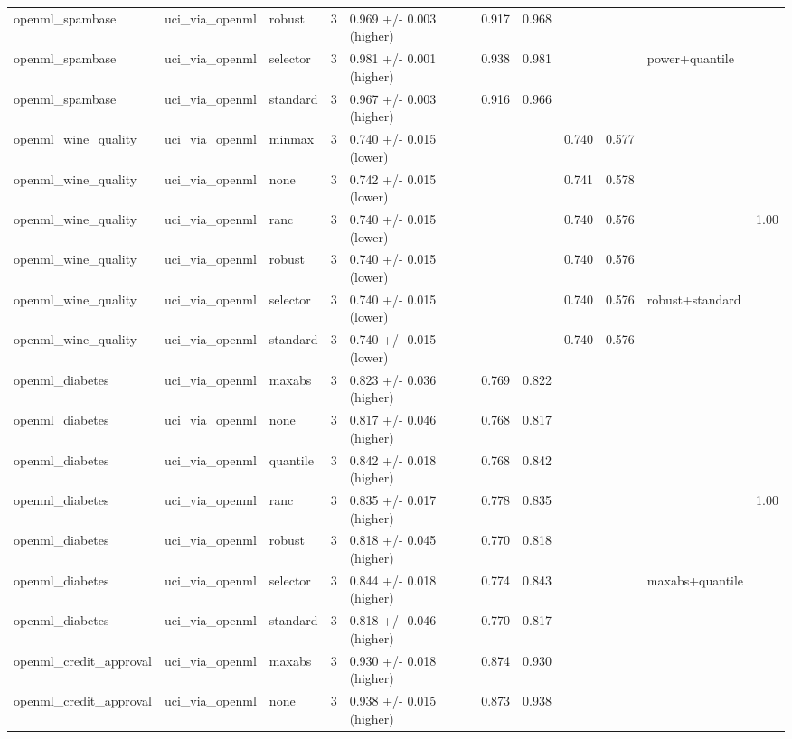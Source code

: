 \begin{tabular}{lllllllllll}
openml\_spambase & uci\_via\_openml & robust & 3 & 0.969 +/- 0.003 (higher) & 0.917 & 0.968 &  &  &  &  \\
openml\_spambase & uci\_via\_openml & selector & 3 & 0.981 +/- 0.001 (higher) & 0.938 & 0.981 &  &  & power+quantile &  \\
openml\_spambase & uci\_via\_openml & standard & 3 & 0.967 +/- 0.003 (higher) & 0.916 & 0.966 &  &  &  &  \\
openml\_wine\_quality & uci\_via\_openml & minmax & 3 & 0.740 +/- 0.015 (lower) &  &  & 0.740 & 0.577 &  &  \\
openml\_wine\_quality & uci\_via\_openml & none & 3 & 0.742 +/- 0.015 (lower) &  &  & 0.741 & 0.578 &  &  \\
openml\_wine\_quality & uci\_via\_openml & ranc & 3 & 0.740 +/- 0.015 (lower) &  &  & 0.740 & 0.576 &  & 1.00 \\
openml\_wine\_quality & uci\_via\_openml & robust & 3 & 0.740 +/- 0.015 (lower) &  &  & 0.740 & 0.576 &  &  \\
openml\_wine\_quality & uci\_via\_openml & selector & 3 & 0.740 +/- 0.015 (lower) &  &  & 0.740 & 0.576 & robust+standard &  \\
openml\_wine\_quality & uci\_via\_openml & standard & 3 & 0.740 +/- 0.015 (lower) &  &  & 0.740 & 0.576 &  &  \\
openml\_diabetes & uci\_via\_openml & maxabs & 3 & 0.823 +/- 0.036 (higher) & 0.769 & 0.822 &  &  &  &  \\
openml\_diabetes & uci\_via\_openml & none & 3 & 0.817 +/- 0.046 (higher) & 0.768 & 0.817 &  &  &  &  \\
openml\_diabetes & uci\_via\_openml & quantile & 3 & 0.842 +/- 0.018 (higher) & 0.768 & 0.842 &  &  &  &  \\
openml\_diabetes & uci\_via\_openml & ranc & 3 & 0.835 +/- 0.017 (higher) & 0.778 & 0.835 &  &  &  & 1.00 \\
openml\_diabetes & uci\_via\_openml & robust & 3 & 0.818 +/- 0.045 (higher) & 0.770 & 0.818 &  &  &  &  \\
openml\_diabetes & uci\_via\_openml & selector & 3 & 0.844 +/- 0.018 (higher) & 0.774 & 0.843 &  &  & maxabs+quantile &  \\
openml\_diabetes & uci\_via\_openml & standard & 3 & 0.818 +/- 0.046 (higher) & 0.770 & 0.817 &  &  &  &  \\
openml\_credit\_approval & uci\_via\_openml & maxabs & 3 & 0.930 +/- 0.018 (higher) & 0.874 & 0.930 &  &  &  &  \\
openml\_credit\_approval & uci\_via\_openml & none & 3 & 0.938 +/- 0.015 (higher) & 0.873 & 0.938 &  &  &  &  \\

\end{tabular}
